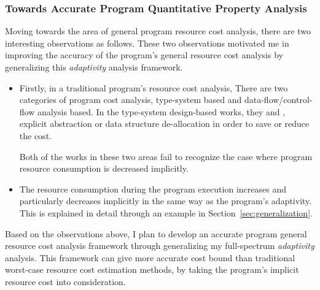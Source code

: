 \subsubsection{Towards Accurate Program Quantitative Property Analysis}
\label{subsec:intro-cost}
Moving towards the area of general program resource cost analysis,
there are two interesting observations as follows.
These two observations motivated me in 
improving the accuracy of the program's general resource cost analysis
by generalizing this \emph{adaptivity} analysis framework.
\begin{itemize}
 \item Firstly, in a traditional program's resource cost analysis,
 There are two categories of program cost analysis, type-system based and data-flow/control-flow analysis based. 
 In the type-system design-based works, they \cite{GustafssonEL05} and \cite{hoffmann_jost_2022}, explicit abstraction or data structure de-allocation in order to save or reduce the cost.
 
 Both of the
 works in these two areas fail to recognize the case where program resource consumption is decreased implicitly.
 \item The resource consumption during the program 
 execution increases and particularly decreases implicitly in the same way as the program's adaptivity. This is explained in detail through an example in Section~\ref*{sec:generalization}.
\end{itemize}
 Based on the observations above, 
 I plan to develop
 an accurate program general resource cost analysis framework through generalizing my full-spectrum \emph{adaptivity} analysis.
 This framework can give more accurate cost bound than traditional worst-case resource cost estimation methods,
 by taking the program's implicit resource cost into consideration.

